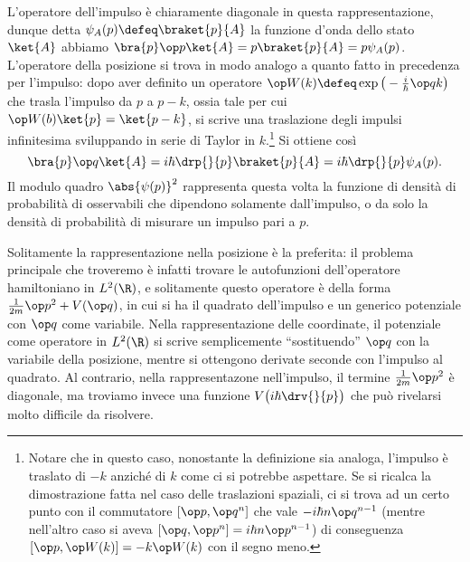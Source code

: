 L'operatore dell'impulso è chiaramente diagonale in questa rappresentazione, dunque detta $\psi_A(p)\defeq\braket{p}{A}$ la funzione d'onda dello stato $\ket{A}$ abbiamo $\bra{p}\op p\ket{A}=p\braket{p}{A}=p\psi_A(p)$.
L'operatore della posizione si trova in modo analogo a quanto fatto in precedenza per l'impulso: dopo aver definito un operatore $\op W(k)\defeq\exp\big(-\frac{i}{\hbar}\op qk\big)$ che trasla l'impulso da $p$ a $p-k$, ossia tale per cui $\op W(b)\ket{p}=\ket{p-k}$, si scrive una traslazione degli impulsi infinitesima sviluppando in serie di Taylor in $k$.\footnote{Notare che in questo caso, nonostante la definizione sia analoga, l'impulso è traslato di $-k$ anzich\'e di $k$ come ci si potrebbe aspettare. Se si ricalca la dimostrazione fatta nel caso delle traslazioni spaziali, ci si trova ad un certo punto con il commutatore $[\op p,\op q^n]$ che vale $-i\hbar n\op q^{n-1}$ (mentre nell'altro caso si aveva $[\op q,\op p^n]=i\hbar n\op p^{n-1}$) di conseguenza $[\op p,\op W(k)]=-k\op W(k)$ con il segno meno.}
Si ottiene cos\`i
\begin{equation}
	\bra{p}\op q\ket{A}=i\hbar\drp{}{p}\braket{p}{A}=i\hbar\drp{}{p}\psi_A(p).
	\label{eq:rappresentazione-posizione-base-impulso}
\end{equation}
Il modulo quadro $\abs{\psi(p)}^2$ rappresenta questa volta la funzione di densità di probabilità di osservabili che dipendono solamente dall'impulso, o da solo la densità di probabilità di misurare un impulso pari a $p$.

Solitamente la rappresentazione nella posizione è la preferita: il problema principale che troveremo è infatti trovare le autofunzioni dell'operatore hamiltoniano in $L^2(\R)$, e solitamente questo operatore è della forma $\frac1{2m}\op p^2+V(\op q)$, in cui si ha il quadrato dell'impulso e un generico potenziale con $\op q$ come variabile.
Nella rappresentazione delle coordinate, il potenziale come operatore in $L^2(\R)$ si scrive semplicemente ``sostituendo'' $\op q$ con la variabile della posizione, mentre si ottengono derivate seconde con l'impulso al quadrato.
Al contrario, nella rappresentazone nell'impulso, il termine $\frac1{2m}\op p^2$ è diagonale, ma troviamo invece una funzione $V\big(i\hbar\drv{}{p}\big)$ che può rivelarsi molto difficile da risolvere.

